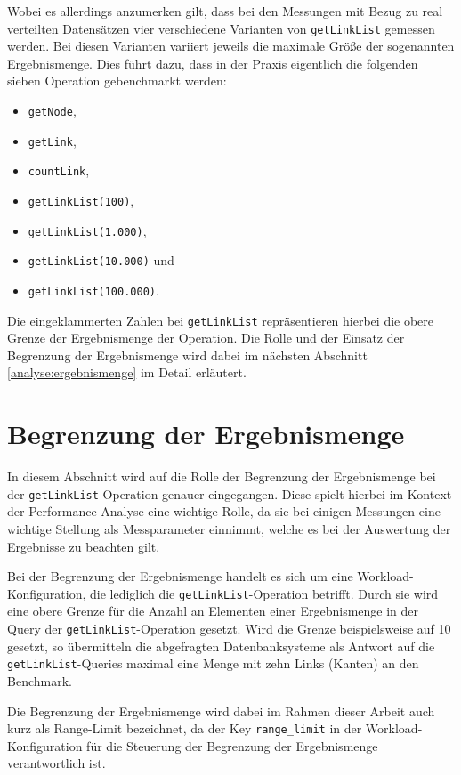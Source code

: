 Wobei es allerdings anzumerken gilt, dass bei den Messungen mit Bezug zu real verteilten Datensätzen vier verschiedene Varianten von \texttt{getLinkList} gemessen werden. Bei diesen Varianten variiert jeweils die maximale Größe der sogenannten Ergebnismenge. Dies führt dazu, dass in der Praxis eigentlich die folgenden sieben Operation gebenchmarkt werden:
\begin{itemize}
    \item \texttt{getNode},
    \item \texttt{getLink},
    \item \texttt{countLink},
    \item \texttt{getLinkList(100)},
    \item \texttt{getLinkList(1.000)},
    \item \texttt{getLinkList(10.000)} und
    \item \texttt{getLinkList(100.000)}.
\end{itemize}
Die eingeklammerten Zahlen bei \texttt{getLinkList} repräsentieren hierbei die obere Grenze der Ergebnismenge der Operation. Die Rolle und der Einsatz der Begrenzung der Ergebnismenge wird dabei im nächsten Abschnitt \autoref{analyse:ergebnismenge} im Detail erläutert. 

\section{Begrenzung der Ergebnismenge}
\label{analyse:ergebnismenge}
In diesem Abschnitt wird auf die Rolle der Begrenzung der Ergebnismenge bei der \texttt{getLinkList}-Operation genauer eingegangen. Diese spielt hierbei im Kontext der Performance-Analyse eine wichtige Rolle, da sie bei einigen Messungen eine wichtige Stellung als Messparameter einnimmt, welche es bei der Auswertung der Ergebnisse zu beachten gilt. 

Bei der Begrenzung der Ergebnismenge handelt es sich um eine Workload-Konfiguration, die lediglich die \texttt{getLinkList}-Operation betrifft. Durch sie wird eine obere Grenze für die Anzahl an Elementen einer Ergebnismenge in der Query der \texttt{getLinkList}-Operation gesetzt. Wird die Grenze beispielsweise auf 10 gesetzt, so übermitteln die abgefragten Datenbanksysteme als Antwort auf die \texttt{getLinkList}-Queries maximal eine Menge mit zehn Links (Kanten) an den Benchmark. 

Die Begrenzung der Ergebnismenge wird dabei im Rahmen dieser Arbeit auch kurz als Range-Limit bezeichnet, da der Key \texttt{range\_limit} in der Workload-Konfiguration für die Steuerung der Begrenzung der Ergebnismenge verantwortlich ist.

